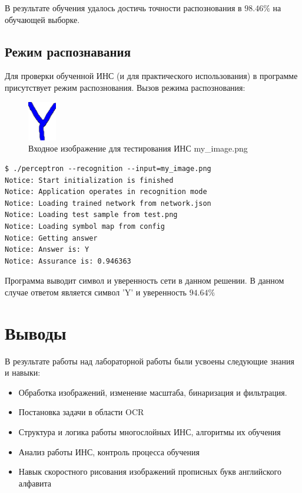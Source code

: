 \documentclass[russian,utf8,emptystyle]{eskdtext}
\begin{document}
В результате обучения удалось достичь точности распознования в $98.46 \%$ на обучающей выборке.

\subsection{Режим распознавания}
Для проверки обученной ИНС (и для практического использования) в программе присутствует режим распознования. Вызов режима распознования:

\begin{figure}[!htb]
\centering
\includegraphics[width=0.11\textwidth]{input-ex-source}
\caption{Входное изображение для тестирования ИНС my\_image.png}
\end{figure}

\begin{verbatim}
$ ./perceptron --recognition --input=my_image.png
Notice: Start initialization is finished
Notice: Application operates in recognition mode
Notice: Loading trained network from network.json
Notice: Loading test sample from test.png
Notice: Loading symbol map from config
Notice: Getting answer
Notice: Answer is: Y
Notice: Assurance is: 0.946363
\end{verbatim}

Программа выводит символ и уверенность сети в данном решении. В данном случае ответом является символ 'Y' и уверенность $94.64\%$

\clearpage
\section{Выводы}
В результате работы над лабораторной работы были усвоены следующие знания и навыки:
\begin{itemize}
\item Обработка изображений, изменение масштаба, бинаризация и фильтрация.
\item Постановка задачи в области OCR
\item Структура и логика работы многослойных ИНС, алгоритмы их обучения
\item Анализ работы ИНС, контроль процесса обучения
\item Навык скоростного рисования изображений прописных букв английского алфавита
\end{itemize}
\end{document}
